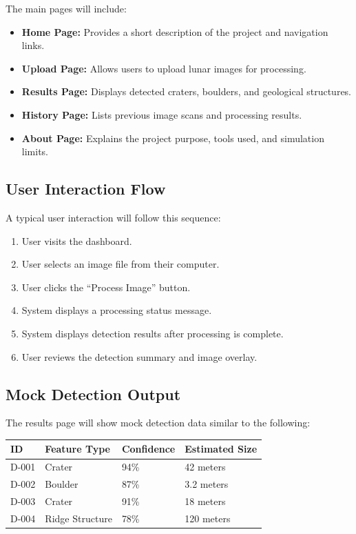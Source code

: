 \documentclass[12pt]{article}
\begin{document}
The main pages will include:

\begin{itemize}
    \item \textbf{Home Page:} Provides a short description of the project and navigation links.
    \item \textbf{Upload Page:} Allows users to upload lunar images for processing.
    \item \textbf{Results Page:} Displays detected craters, boulders, and geological structures.
    \item \textbf{History Page:} Lists previous image scans and processing results.
    \item \textbf{About Page:} Explains the project purpose, tools used, and simulation limits.
\end{itemize}

\subsection{User Interaction Flow}

A typical user interaction will follow this sequence:

\begin{enumerate}
    \item User visits the dashboard.
    \item User selects an image file from their computer.
    \item User clicks the ``Process Image'' button.
    \item System displays a processing status message.
    \item System displays detection results after processing is complete.
    \item User reviews the detection summary and image overlay.
\end{enumerate}

\subsection{Mock Detection Output}

The results page will show mock detection data similar to the following:

\begin{longtable}{|p{1in}|p{1.5in}|p{1.5in}|p{1.5in}|}
\hline
\textbf{ID} & \textbf{Feature Type} & \textbf{Confidence} & \textbf{Estimated Size} \\
\hline
D-001 & Crater & 94\% & 42 meters \\
\hline
D-002 & Boulder & 87\% & 3.2 meters \\
\hline
D-003 & Crater & 91\% & 18 meters \\
\hline
D-004 & Ridge Structure & 78\% & 120 meters \\
\hline
\end{longtable}
\end{document}
